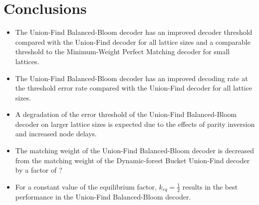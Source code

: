 \chapter{Conclusions}


\begin{itemize}
  \item The Union-Find Balanced-Bloom decoder has an improved decoder threshold compared with the Union-Find decoder for all lattice sizes and a comparable threshold to the Minimum-Weight Perfect Matching decoder for small lattices.
  \item The Union-Find Balanced-Bloom decoder has an improved decoding rate at the threshold error rate compared with the Union-Find decoder for all lattice sizes. 
  \item A degradation of the error threshold of the Union-Find Balanced-Bloom decoder on larger lattice sizes is expected due to the effects of parity inversion and increased node delays. 
  \item The matching weight of the Union-Find Balanced-Bloom decoder is decreased from the matching weight of the Dynamic-forest Bucket Union-Find decoder by a factor of ?
  \item For a constant value of the equilibrium factor, $k_{eq}=\frac{1}{2}$ results in the best performance in the Union-Find Balanced-Bloom decoder.  
\end{itemize}

